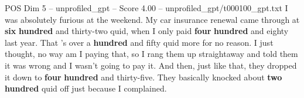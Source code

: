 \begin{textsample}{POS Dim 5 – unprofiled\_gpt – Score 4.00 – unprofiled\_gpt/t000100\_gpt.txt}  \label{ex:f5_pos_036}
I was absolutely furious at the weekend.
My car insurance renewal came through at \textbf{six} \textbf{hundred} and thirty-two quid, when I only paid \textbf{four} \textbf{hundred} and eighty last year.
That ’s over a \textbf{hundred} and fifty quid more for no reason.
I just thought, no way am I paying that, so I rang them up straightaway and told them it was wrong and I wasn't going to pay it.
And then, just like that, they dropped it down to \textbf{four} \textbf{hundred} and thirty-five.
They basically knocked about \textbf{two} \textbf{hundred} quid off just because I complained.

\end{textsample}
